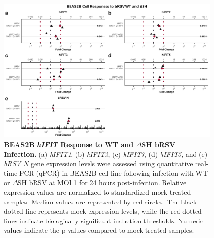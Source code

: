 \begin{figure}
    \centering
    \includegraphics[width=1\linewidth]{06. Chapter 1/Figs/01. Induction/11. beas2b_brsv_moi1.pdf}
    \caption[BEAS2B \textit{hIFIT} Response to WT and \(\Delta\)SH bRSV Infection.]{\textbf{BEAS2B \textit{hIFIT} Response to WT and \(\Delta\)SH bRSV Infection.} (a) \textit{hIFIT1}, (b) \textit{hIFIT2}, (c) \textit{hIFIT3}, (d) \textit{hIFIT5}, and (e) \textit{bRSV N} gene expression levels were assessed using quantitative real-time PCR (qPCR) in BEAS2B cell line following infection with WT or \(\Delta\)SH bRSV at MOI 1 for 24 hours post-infection. Relative expression values are normalized to standardized mock-treated samples. Median values are represented by red circles. The black dotted line represents mock expression levels, while the red dotted lines indicate biologically significant induction thresholds. Numeric values indicate the p-values compared to mock-treated samples.}
    \label{fig:BEAS2B responses to bRSV WT and dSH.}
\end{figure}

